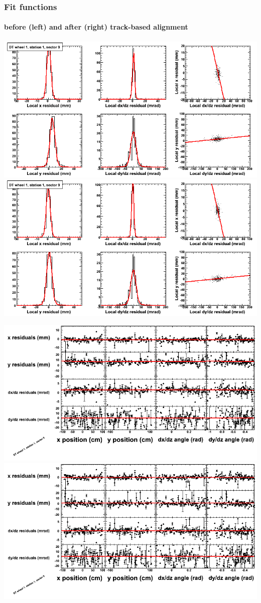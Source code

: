 \documentclass[compress]{beamer}
\begin{document}
\begin{frame}
\frametitle{Fit functions}
\framesubtitle{before (left) and after (right) track-based alignment}
\includegraphics[width=0.5\linewidth]{fitfunctions_re01/MBwhDst1sec09_bellcurves.png} \includegraphics[width=0.5\linewidth]{fitfunctions_re05/MBwhDst1sec09_bellcurves.png}

\includegraphics[width=0.5\linewidth]{fitfunctions_re01/MBwhDst1sec09_polynomials.png} \includegraphics[width=0.5\linewidth]{fitfunctions_re05/MBwhDst1sec09_polynomials.png}
\end{frame}
\end{document}
